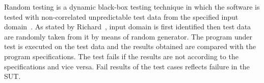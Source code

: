 
Random testing is a dynamic black-box testing technique in which the software is tested with non-correlated unpredictable test data from the specified input domain~\cite{chan2003normalized}. As stated by Richard~\cite{hamlet1994random}, input domain is first identified then test data are randomly taken from it by means of random generator. The program under test is executed on the test data and the results obtained are compared with the program specifications. The test fails if the results are not according to the specifications and vice versa. Fail results of the test cases reflects failure in the SUT.




